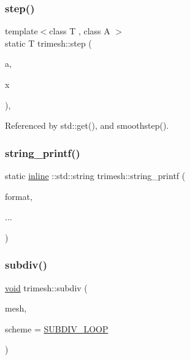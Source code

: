 \mbox{\label{namespacetrimesh_acb6637b7876342110a33099891cc23e1}} 
\subsubsection{\texorpdfstring{step()}{step()}}
{\footnotesize\ttfamily template$<$class T , class A $>$ \\
static T trimesh\+::step (\begin{DoxyParamCaption}\item[{const A \&}]{a,  }\item[{const T \&}]{x }\end{DoxyParamCaption})\hspace{0.3cm}{\ttfamily [inline]}, {\ttfamily [static]}}



Referenced by std\+::get(), and smoothstep().

\mbox{\label{namespacetrimesh_a3c56ee7219dbd7fd846eac4add4e9aa6}} 
\subsubsection{\texorpdfstring{string\+\_\+printf()}{string\_printf()}}
{\footnotesize\ttfamily static \hyperlink{XForm_8h_a00d24c7231be28dbaf71f5408f30e44c}{inline} \+::std\+::string trimesh\+::string\+\_\+printf (\begin{DoxyParamCaption}\item[{const char $\ast$}]{format,  }\item[{}]{... }\end{DoxyParamCaption})\hspace{0.3cm}{\ttfamily [static]}}

\mbox{\label{namespacetrimesh_a6f861eefce96c48dfcdfda348a2efa43}} 
\subsubsection{\texorpdfstring{subdiv()}{subdiv()}}
{\footnotesize\ttfamily \hyperlink{namespacetrimesh_a784ddfd979e1c579bda795a8edfc3f43}{void} trimesh\+::subdiv (\begin{DoxyParamCaption}\item[{\hyperlink{classtrimesh_1_1TriMesh}{Tri\+Mesh} $\ast$}]{mesh,  }\item[{\hyperlink{namespacetrimesh_a3480f7a1d4d92b412ded9f7cfb1450bd}{Subdiv\+Scheme}}]{scheme = {\ttfamily \hyperlink{namespacetrimesh_a3480f7a1d4d92b412ded9f7cfb1450bdafebba588d345b33d58dd0fe8e2868a57}{S\+U\+B\+D\+I\+V\+\_\+\+L\+O\+OP}} }\end{DoxyParamCaption})}

